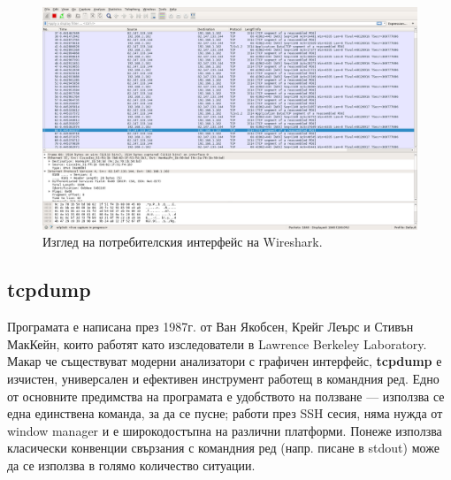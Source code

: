 \documentclass[12pt,a4paper,oneside]{book}
\begin{document}
\begin{figure}[h!]
  \centering
  \includegraphics[width=1.0\textwidth]{figures/wireshark.png}
  \caption{Изглед на потребителския интерфейс на Wireshark.}
  \label{wireshark_fig}
\end{figure}

\subsection{tcpdump}

Програмата е написана през 1987г. от Ван Якобсен, Крейг Леърс и Стивън МакКейн,
които работят като изследователи в Lawrence Berkeley Laboratory. Макар че
съществуват модерни анализатори с графичен интерфейс, \textbf{tcpdump} е
изчистен, универсален и ефективен инструмент работещ в командния ред. Едно от
основните предимства на програмата е удобството на ползване --- използва се една
единствена команда, за да се пусне; работи през SSH сесия, няма нужда от window
manager и е широкодостъпна на различни платформи. Понеже използва класически
конвенции свързания с командния ред (напр. писане в stdout) може да се използва
в голямо количество ситуации.
\end{document}
